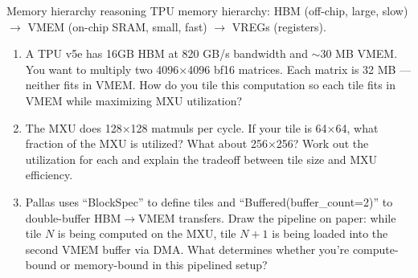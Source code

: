 \begin{thinkfirst}{Memory hierarchy reasoning}
TPU memory hierarchy: HBM (off-chip, large, slow) $\to$ VMEM (on-chip SRAM, small, fast) $\to$ VREGs (registers).

\begin{center}
\end{center}

\begin{enumerate}
  \item A TPU v5e has 16GB HBM at 820 GB/s bandwidth and $\sim$30 MB VMEM. You want to multiply two 4096$\times$4096 bf16 matrices. Each matrix is 32 MB --- neither fits in VMEM. How do you tile this computation so each tile fits in VMEM while maximizing MXU utilization?

  \item The MXU does 128$\times$128 matmuls per cycle. If your tile is 64$\times$64, what fraction of the MXU is utilized? What about 256$\times$256? Work out the utilization for each and explain the tradeoff between tile size and MXU efficiency.

  \item Pallas uses ``BlockSpec'' to define tiles and ``Buffered(buffer\_count=2)'' to double-buffer HBM$\to$VMEM transfers. Draw the pipeline on paper: while tile $N$ is being computed on the MXU, tile $N+1$ is being loaded into the second VMEM buffer via DMA. What determines whether you're compute-bound or memory-bound in this pipelined setup?


\end{enumerate}
\end{thinkfirst}
